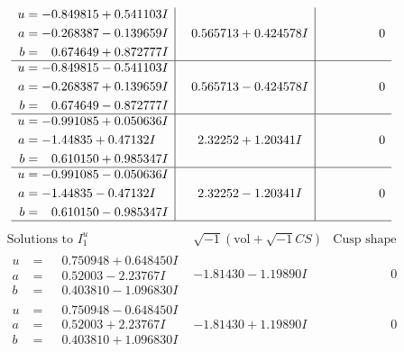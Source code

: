 \documentclass[1p]{elsarticle_modified}
\theoremstyle{definition}
\newcommand{\I}{\sqrt{-1}}
\begin{document}
$$\begin{array}{c|c|c}
\begin{aligned}
u &= -0.849815 + 0.541103 I \\
a &= -0.268387 - 0.139659 I \\
b &= \phantom{-}0.674649 + 0.872777 I\end{aligned}
 & \phantom{-}0.565713 + 0.424578 I & \phantom{-0.000000 } 0 \\ \hline\begin{aligned}
u &= -0.849815 - 0.541103 I \\
a &= -0.268387 + 0.139659 I \\
b &= \phantom{-}0.674649 - 0.872777 I\end{aligned}
 & \phantom{-}0.565713 - 0.424578 I & \phantom{-0.000000 } 0 \\ \hline\begin{aligned}
u &= -0.991085 + 0.050636 I \\
a &= -1.44835 + 0.47132 I \\
b &= \phantom{-}0.610150 + 0.985347 I\end{aligned}
 & \phantom{-}2.32252 + 1.20341 I & \phantom{-0.000000 } 0 \\ \hline\begin{aligned}
u &= -0.991085 - 0.050636 I \\
a &= -1.44835 - 0.47132 I \\
b &= \phantom{-}0.610150 - 0.985347 I\end{aligned}
 & \phantom{-}2.32252 - 1.20341 I & \phantom{-0.000000 } 0\\
 \hline 
 \end{array}$$\newpage$$\begin{array}{c|c|c}  
\text{Solutions to }I^u_{1}& \I (\text{vol} + \sqrt{-1}CS) & \text{Cusp shape}\\
 \hline 
\begin{aligned}
u &= \phantom{-}0.750948 + 0.648450 I \\
a &= \phantom{-}0.52003 - 2.23767 I \\
b &= \phantom{-}0.403810 - 1.096830 I\end{aligned}
 & -1.81430 - 1.19890 I & \phantom{-0.000000 } 0 \\ \hline\begin{aligned}
u &= \phantom{-}0.750948 - 0.648450 I \\
a &= \phantom{-}0.52003 + 2.23767 I \\
b &= \phantom{-}0.403810 + 1.096830 I\end{aligned}
 & -1.81430 + 1.19890 I & \phantom{-0.000000 } 0 \\ \hline\begin{aligned}

\end{aligned}
\end{array}$$
\end{document}
